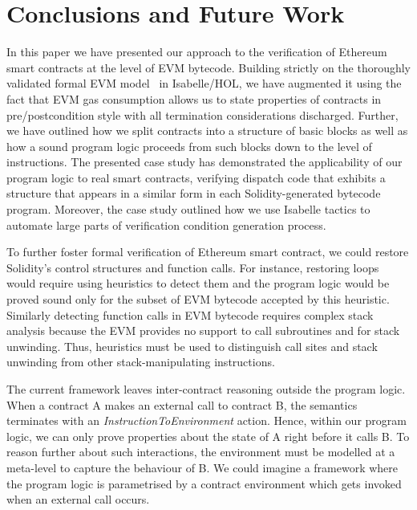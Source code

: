 \documentclass[sigplan,10pt,review]{acmart}\settopmatter{printfolios=true,printccs=false,printacmref=false}
\begin{document}

\section{Conclusions and Future Work}
\label{sec:concl}
In this paper we have presented our approach to the verification of Ethereum smart contracts
at the level of EVM bytecode. Building strictly on the thoroughly validated formal EVM model~\cite{Yoichi} in Isabelle/HOL,
we have augmented it using the fact that EVM gas consumption allows us to state properties of contracts in pre/postcondition style
with all termination considerations discharged. Further, we have outlined how we split contracts into a
structure of basic blocks as well as how a sound program logic proceeds from such blocks down to the level of instructions. 
The presented case study has demonstrated the applicability of our
program logic to real smart contracts, verifying dispatch code that exhibits a structure
that appears in a similar form
in each Solidity-generated bytecode program. 
Moreover, the case study outlined how we use Isabelle tactics to automate
large parts of verification condition generation process.

To further foster formal verification of Ethereum smart contract, we
could restore Solidity's control structures and function calls.
For instance, restoring loops would require using heuristics
to detect them and the program logic would be proved sound only
for the subset of EVM bytecode accepted by this heuristic.
Similarly detecting function calls in EVM bytecode requires
complex stack analysis because the EVM provides no support to call
subroutines and for stack unwinding.
Thus, heuristics must be used to distinguish call sites and
stack unwinding from other stack-manipulating instructions.

The current framework leaves inter-contract
reasoning outside the program logic.
When a contract A makes an external call to contract B,
the semantics terminates with an \textit{InstructionToEnvironment} action.
Hence, within our program logic, we can only prove properties
about the state of A right before it calls B.
To reason further about such interactions, the environment
must be modelled at a meta-level to capture the behaviour of B.
We could imagine a framework where the program logic is parametrised
by a contract environment which gets invoked when an external
call occurs.
\end{document}
